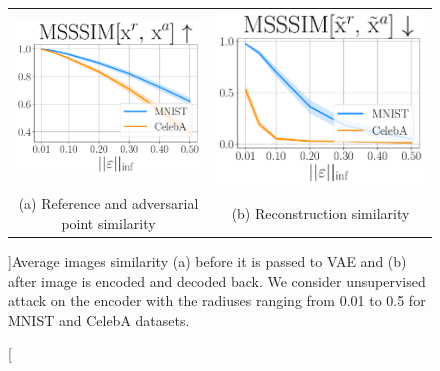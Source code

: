 \begin{figure}[ht]
    \centering
    \begin{tabular}{cc}
        \includegraphics[width=0.4\columnwidth]{pics/3_adv_att/radius_ref_sim.pdf} &
        \includegraphics[width=0.4\columnwidth]{pics/3_adv_att/radius_ref_rec_sim.pdf} \\
        \multirow{2}{0.4\columnwidth}{\centering \small (a) Reference and adversarial point similarity} &
        \multirow{2}{0.4\columnwidth}{\centering \small (b) Reconstruction similarity } 
        \\
        \\
    \end{tabular}
    \caption[][\baselineskip]{Average images similarity (a) before it is passed to VAE and (b) after image is encoded and decoded back. We consider unsupervised attack on the encoder with the radiuses ranging from 0.01 to 0.5 for MNIST and CelebA datasets.}
    \label{fig:radius_metrics}
        \vspace*{2\baselineskip}
\end{figure}

